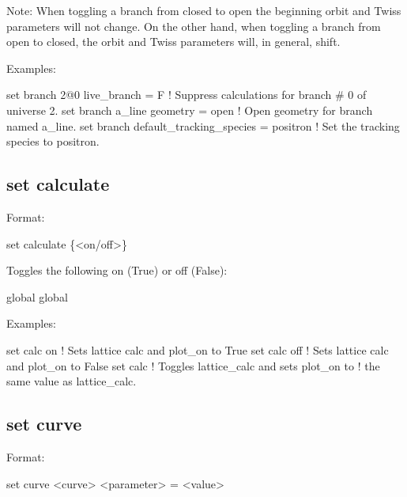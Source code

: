 {{Note: When toggling a branch from closed to open the beginning orbit and Twiss parameters will not
change. On the other hand, when toggling a branch from open to closed, the orbit and Twiss
parameters will, in general, shift.

Examples:
\begin{example}
  set branch 2@0 live_branch = F     ! Suppress calculations for branch \# 0 of universe 2.
  set branch a_line geometry = open  ! Open geometry for branch named a_line.
  set branch default_tracking_species = positron
                                     ! Set the tracking species to positron.
\end{example}


\subsection{set calculate}
\label{s:set.calc}

Format:
\begin{example}
  set calculate \{<on/off>\}
\end{example}

Toggles the following on (True) or off (False):
\begin{example}
  global%
  global%
\end{example}

Examples:
\begin{example}
  set calc on    ! Sets lattice calc and plot_on to True
  set calc off   ! Sets lattice calc and plot_on to False
  set calc       ! Toggles lattice_calc and sets plot_on to
                 !  the same value as lattice_calc.
\end{example}


\subsection{set curve}
\label{s:set.curve}

Format:
\begin{example}
  set curve <curve> <parameter> = <value>
\end{example}

}}
